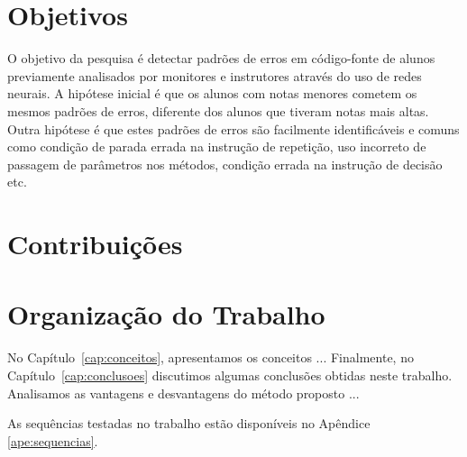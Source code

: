 \section{Objetivos}
\label{sec:objetivo}

O objetivo da pesquisa é detectar padrões de erros em código-fonte de alunos previamente analisados por monitores e instrutores através do uso de redes neurais. A hipótese inicial é que os alunos com notas menores cometem os mesmos padrões de erros, diferente dos alunos que tiveram notas mais altas. Outra hipótese é que estes padrões de erros são facilmente identificáveis e comuns como condição de parada errada na instrução de repetição, uso incorreto de passagem de parâmetros nos métodos, condição errada na instrução de decisão etc.

\section{Contribuições}
\label{sec:contribucoes}



\section{Organização do Trabalho}
\label{sec:organizacao_trabalho}

No Capítulo~\ref{cap:conceitos}, apresentamos os conceitos ... Finalmente, no
Capítulo~\ref{cap:conclusoes} discutimos algumas conclusões obtidas neste
trabalho. Analisamos as vantagens e desvantagens do método proposto ... 

As sequências testadas no trabalho estão disponíveis no Apêndice \ref{ape:sequencias}.
